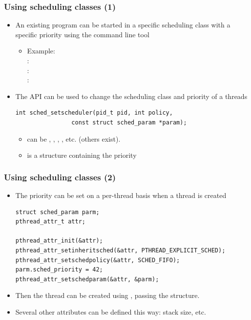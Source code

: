 \begin{frame}[fragile]
  \frametitle{Using scheduling classes (1)}
  \begin{itemize}
  \item An existing program can be started in a specific scheduling
    class with a specific priority using the  command line tool
    \begin{itemize}
    \item Example:  \\
        : \\
	: \\
	: 
    \end{itemize}
  \item The  API can be used to change the scheduling class
    and priority of a threads
    \begin{block}{}
\begin{verbatim}
int sched_setscheduler(pid_t pid, int policy,
                const struct sched_param *param);
\end{verbatim}
    \end{block}{}
    \begin{itemize}
    \item {} can be , ,
      , , etc. (others exist).
    \item {} is a structure containing the priority
    \end{itemize}
  \end{itemize}
\end{frame}

\begin{frame}[fragile]
  \frametitle{Using scheduling classes (2)}
  \begin{itemize}
  \item The priority can be set on a per-thread basis when a thread is
    created
    \begin{block}{}
\footnotesize
\begin{verbatim}
struct sched_param parm;
pthread_attr_t attr;

pthread_attr_init(&attr);
pthread_attr_setinheritsched(&attr, PTHREAD_EXPLICIT_SCHED);
pthread_attr_setschedpolicy(&attr, SCHED_FIFO);
parm.sched_priority = 42;
pthread_attr_setschedparam(&attr, &parm);
\end{verbatim}
\normalsize
    \end{block}
  \item Then the thread can be created using ,
    passing the  structure.
  \item Several other attributes can be defined this way: stack size,
    etc.
  \end{itemize}
\end{frame}


